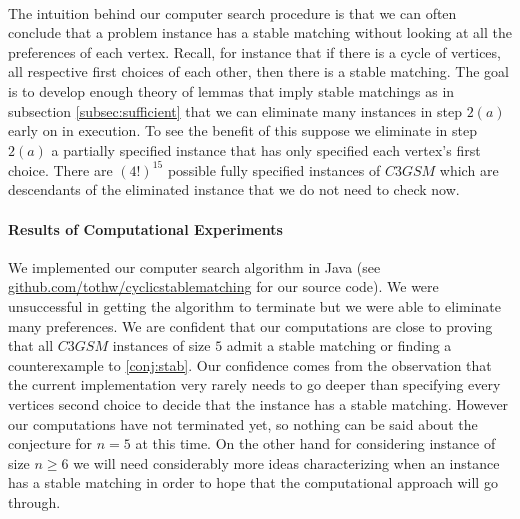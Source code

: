 \paragraph{}
The intuition behind our computer search procedure is that we can often conclude that a problem instance has a stable matching without looking at all the preferences of each vertex. Recall, for instance that if there is a cycle of vertices, all respective first choices of each other, then there is a stable matching. The goal is to develop enough theory of lemmas that imply stable matchings as in subsection \ref{subsec:sufficient} that we can eliminate many instances in step $2(a)$ early on in execution. To see the benefit of this suppose we eliminate in step $2(a)$ a partially specified instance that has only specified each vertex's first choice. There are $(4!)^{15}$ possible fully specified instances of $C3GSM$ which are descendants of the eliminated instance that we do not need to check now.
\paragraph{Results of Computational Experiments}
We implemented our computer search algorithm in Java (see \href{https://github.com/tothw/cyclicstablematching}{github.com/tothw/cyclicstablematching} for our source code). We were unsuccessful in getting the algorithm to terminate but we were able to eliminate many preferences. We are confident that our computations are close to proving that all $C3GSM$ instances of size $5$ admit a stable matching or finding a counterexample to \ref{conj:stab}. Our confidence comes from the observation that the current implementation very rarely needs to go deeper than specifying every vertices second choice to decide that the instance has a stable matching. However our computations have not terminated yet, so nothing can be said about the conjecture for $n=5$ at this time. On the other hand for considering instance of size $n \geq 6$ we will need considerably more ideas characterizing when an instance has a stable matching in order to hope that the computational approach will go through.
